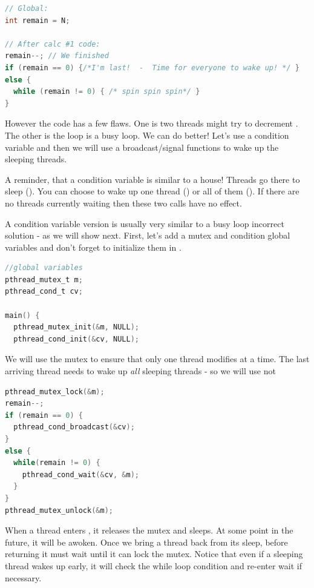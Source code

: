 \begin{lstlisting}[language=C]
// Global:
int remain = N;

// After calc #1 code:
remain--; // We finished
if (remain == 0) {/*I'm last!  -  Time for everyone to wake up! */ }
else {
  while (remain != 0) { /* spin spin spin*/ }
}
\end{lstlisting}

However the code has a few flaws.
One is two threads might try to decrement .
The other is the loop is a busy loop.
We can do better!
Let's use a condition variable and then we will use a broadcast/signal functions to wake up the sleeping threads.

A reminder, that a condition variable is similar to a house! Threads go there to sleep ().
You can choose to wake up one thread () or all of them ().
If there are no threads currently waiting then these two calls have no effect.

A condition variable version is usually very similar to a busy loop incorrect solution - as we will show next.
First, let's add a mutex and condition global variables and don't forget to initialize them in .

\begin{lstlisting}[language=C]
//global variables
pthread_mutex_t m;
pthread_cond_t cv;

main() {
  pthread_mutex_init(&m, NULL);
  pthread_cond_init(&cv, NULL);
\end{lstlisting}

We will use the mutex to ensure that only one thread modifies  at a time. The last arriving thread needs to wake up \emph{all} sleeping threads - so we will use  not 

\begin{lstlisting}[language=C]
pthread_mutex_lock(&m);
remain--;
if (remain == 0) {
  pthread_cond_broadcast(&cv);
}
else {
  while(remain != 0) {
    pthread_cond_wait(&cv, &m);
  }
}
pthread_mutex_unlock(&m);
\end{lstlisting}

When a thread enters , it releases the mutex and sleeps.
At some point in the future, it will be awoken.
Once we bring a thread back from its sleep, before returning it must wait until it can lock the mutex.
Notice that even if a sleeping thread wakes up early, it will check the while loop condition and re-enter wait if necessary.

